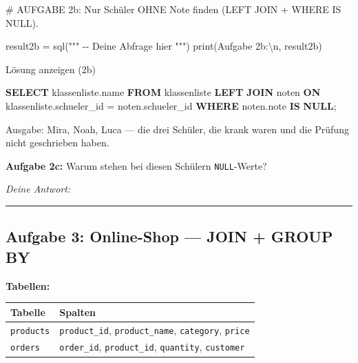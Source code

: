 \documentclass[
  nswissgerman,
  a4paper,
  DIV=11,
  numbers=noendperiod,
  ngerman]{scrreprt}
\newenvironment{Shaded}{\begin{snugshade}}{\end{snugshade}}
\newcommand{\BuiltInTok}[1]{\textcolor[rgb]{0.00,0.23,0.31}{#1}}
\newcommand{\CharTok}[1]{\textcolor[rgb]{0.13,0.47,0.30}{#1}}
\newcommand{\CommentTok}[1]{\textcolor[rgb]{0.37,0.37,0.37}{#1}}
\newcommand{\KeywordTok}[1]{\textcolor[rgb]{0.00,0.23,0.31}{\textbf{#1}}}
\newcommand{\NormalTok}[1]{\textcolor[rgb]{0.00,0.23,0.31}{#1}}
\newcommand{\OperatorTok}[1]{\textcolor[rgb]{0.37,0.37,0.37}{#1}}
\newcommand{\StringTok}[1]{\textcolor[rgb]{0.13,0.47,0.30}{#1}}
\newcounter{none} %
\begin{document}
\begin{Shaded}
\begin{Highlighting}[numbers=left,,]
\CommentTok{\# AUFGABE 2b: Nur Schüler OHNE Note finden (LEFT JOIN + WHERE IS NULL).}

\NormalTok{result2b }\OperatorTok{=}\NormalTok{ sql(}\StringTok{"""}
\StringTok{{-}{-} Deine Abfrage hier}
\StringTok{"""}\NormalTok{)}
\BuiltInTok{print}\NormalTok{(}\StringTok{\textquotesingle{}Aufgabe 2b:}\CharTok{\textbackslash{}n}\StringTok{\textquotesingle{}}\NormalTok{, result2b)}
\end{Highlighting}
\end{Shaded}

Lösung anzeigen (2b)

\begin{Shaded}
\begin{Highlighting}[numbers=left,,]
\KeywordTok{SELECT}\NormalTok{ klassenliste.name}
\KeywordTok{FROM}\NormalTok{ klassenliste}
\KeywordTok{LEFT} \KeywordTok{JOIN}\NormalTok{ noten}
  \KeywordTok{ON}\NormalTok{ klassenliste.schueler\_id }\OperatorTok{=}\NormalTok{ noten.schueler\_id}
\KeywordTok{WHERE}\NormalTok{ noten.note }\KeywordTok{IS} \KeywordTok{NULL}\NormalTok{;}
\end{Highlighting}
\end{Shaded}

Ausgabe: Mira, Noah, Luca --- die drei Schüler, die krank waren und die
Prüfung nicht geschrieben haben.

\textbf{Aufgabe 2c:} Warum stehen bei diesen Schülern
\texttt{NULL}-Werte?

\emph{Deine Antwort:}

\begin{center}\rule{0.5\linewidth}{0.5pt}\end{center}

\subsection{Aufgabe 3: Online-Shop --- JOIN + GROUP
BY}\label{aufgabe-3-online-shop-join-group-by}

\textbf{Tabellen:}

{\def\LTcaptype{none} %
\begin{longtable}[]{@{}ll@{}}
\toprule\noalign{}
Tabelle & Spalten \\
\midrule\noalign{}
\endhead
\bottomrule\noalign{}
\endlastfoot
\texttt{products} & \texttt{product\_id}, \texttt{product\_name},
\texttt{category}, \texttt{price} \\
\texttt{orders} & \texttt{order\_id}, \texttt{product\_id},
\texttt{quantity}, \texttt{customer} \\
\end{longtable}
}
\end{document}
